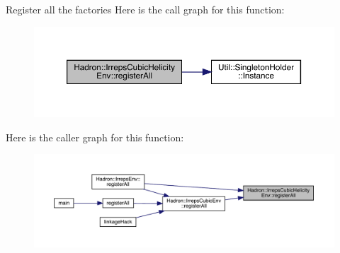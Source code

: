 Register all the factories Here is the call graph for this function\+:\nopagebreak
\begin{figure}[H]
\begin{center}
\leavevmode
\includegraphics[width=350pt]{dc/ddc/namespaceHadron_1_1IrrepsCubicHelicityEnv_a3c43156ee3e7bda6a9a9536083bfdeff_cgraph}
\end{center}
\end{figure}
Here is the caller graph for this function\+:
\nopagebreak
\begin{figure}[H]
\begin{center}
\leavevmode
\includegraphics[width=350pt]{dc/ddc/namespaceHadron_1_1IrrepsCubicHelicityEnv_a3c43156ee3e7bda6a9a9536083bfdeff_icgraph}
\end{center}
\end{figure}
